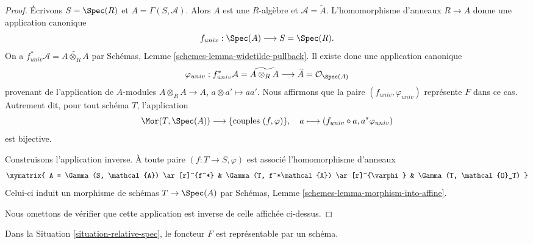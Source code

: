 \begin{proof}
Écrivons $S = \Spec(R)$ et $A = \Gamma(S, \mathcal{A})$.
Alors $A$ est une $R$-algèbre et $\mathcal{A} = \widetilde A$.
L'homomorphisme d'anneaux $R \to A$ donne une application canonique
$$
f_{univ} : \Spec(A)
\longrightarrow
S = \Spec(R).
$$
On a
$f_{univ}^*\mathcal{A} =  \widetilde{A \otimes_R A}$
par Schémas, Lemme \ref{schemes-lemma-widetilde-pullback}.
Il existe donc une application canonique
$$
\varphi_{univ} :
f_{univ}^*\mathcal{A} = \widetilde{A \otimes_R A}
\longrightarrow
\widetilde A = \mathcal{O}_{\Spec(A)}
$$
provenant de l'application de $A$-modules $A \otimes_R A \to A$,
$a \otimes a' \mapsto aa'$. Nous affirmons que la paire
$(f_{univ}, \varphi_{univ})$ représente $F$ dans ce cas.
Autrement dit, pour tout schéma $T$, l'application
$$
\Mor(T, \Spec(A)) \longrightarrow \{\text{couples } (f, \varphi)\},\quad
a \longmapsto (f_{univ} \circ a, a^*\varphi_{univ})
$$
est bijective.

\medskip\noindent
Construisons l'application inverse.
À toute paire $(f : T \to S, \varphi)$ est associé l'homomorphisme d'anneaux
$$
\xymatrix{
A = \Gamma(S, \mathcal{A}) \ar[r]^{f^*} &
\Gamma(T, f^*\mathcal{A}) \ar[r]^{\varphi} &
\Gamma(T, \mathcal{O}_T)
}
$$
Celui-ci induit un morphisme de schémas $T \to \Spec(A)$
par Schémas, Lemme \ref{schemes-lemma-morphism-into-affine}.

\medskip\noindent
Nous omettons de vérifier que cette application est inverse de celle
affichée ci-dessus.
\end{proof}

\begin{lemma}
\label{lemma-spec}
Dans la Situation \ref{situation-relative-spec},
le foncteur $F$ est représentable par un schéma.
\end{lemma}


